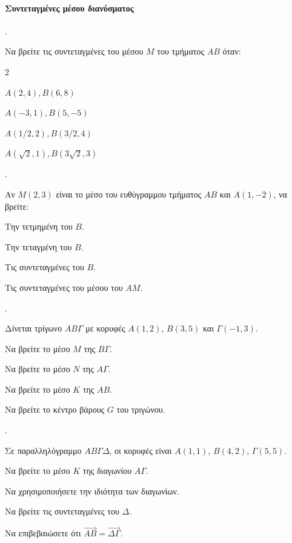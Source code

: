 \documentclass[11pt,a4paper,twocolumn]{article}
\newcounter{askhsh}
\newcommand{\askhsh}{\large\theaskhsh.\ \addtocounter{askhsh}{1}}
\begin{document}
\paragraph{Συντεταγμένες μέσου διανύσματος}
\askhsh Να βρείτε τις συντεταγμένες του μέσου $M$ του τμήματος $AB$ όταν:
\begin{multicols}{2}
\begin{alist}
    \item $A(2, 4), B(6, 8)$
    \item $A(-3, 1), B(5, -5)$
    \item $A(1/2, 2), B(3/2, 4)$
    \item $A(\sqrt{2}, 1), B(3\sqrt{2}, 3)$
\end{alist}
\end{multicols}

\askhsh Αν $M(2, 3)$ είναι το μέσο του ευθύγραμμου τμήματος $AB$ και $A(1, -2)$, να βρείτε:

\begin{alist}
    \item Την τετμημένη του $B$.
    \item Την τεταγμένη του $B$.
    \item Τις συντεταγμένες του $B$.
    \item Τις συντεταγμένες του μέσου του $AM$.
\end{alist}


\askhsh Δίνεται τρίγωνο $AB\Gamma$ με κορυφές $A(1, 2)$, $B(3, 5)$ και $\Gamma(-1, 3)$.

\begin{alist}
    \item Να βρείτε το μέσο $M$ της $B\Gamma$.
    \item Να βρείτε το μέσο $N$ της $A\Gamma$.
    \item Να βρείτε το μέσο $K$ της $AB$.
    \item Να βρείτε το κέντρο βάρους $G$ του τριγώνου.
\end{alist}


\askhsh Σε παραλληλόγραμμο $AB\Gamma\Delta$, οι κορυφές είναι $A(1, 1)$, $B(4, 2)$, $\Gamma(5, 5)$.

\begin{alist}
    \item Να βρείτε το μέσο $K$ της διαγωνίου $A\Gamma$.
    \item Να χρησιμοποιήσετε την ιδιότητα των διαγωνίων.
    \item Να βρείτε τις συντεταγμένες του $\Delta$.
    \item Να επιβεβαιώσετε ότι $\vec{AB} = \vec{\Delta\Gamma}$.
\end{alist}
\end{document}
